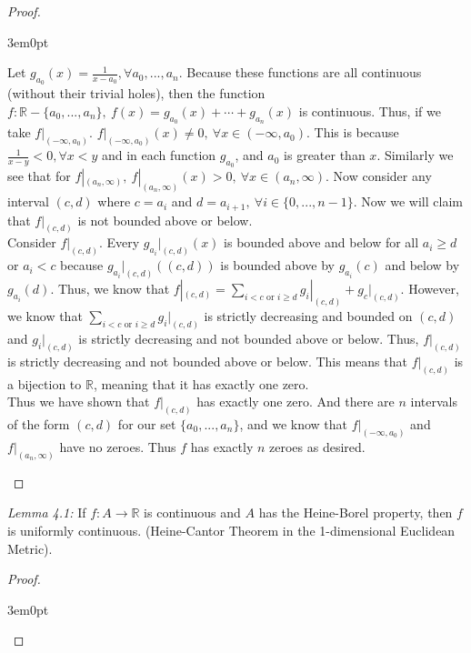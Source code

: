 \documentclass[11pt]{article}
\newcommand{\R}{\mathbb{R}}
\newenvironment{myproof}
{\begin{proof} \begin{adjustwidth}{3em}{0pt}$ $\par\nobreak\ignorespaces}
{\end{adjustwidth} \end{proof}}
\begin{document}
\begin{flushleft}
\begin{myproof}
Let $g_{a_0}(x) = \frac{1}{x - a_0}, \forall a_0,...,a_n$. Because these functions are all continuous (without their trivial holes), then the function $f: \R - \{a_0,...,a_n\}, \ f(x) = g_{a_0}(x) + \cdots + g_{a_n}(x)$ is continuous. Thus, if we take $f|_{(-\infty, a_0)}$. $f|_{(-\infty, a_0)}(x) \neq 0, \ \forall x \in (- \infty, a_0)$. This is because $\frac{1}{x-y} < 0, \forall x < y$ and in each function $g_{a_0}$, and $a_0$ is greater than $x$. Similarly we see that for $f|_{(a_n, \infty)}, \ f|_{(a_n, \infty)}(x) > 0, \ \forall x \in (a_n, \infty)$. Now consider any interval $(c,d)$ where $c = a_i$ and $d = a_{i+1}, \ \forall i \in \{0,...,n-1\}$. Now we will claim that $f|_{(c,d)}$ is not bounded above or below. \\
\bigskip
Consider $f|_{(c,d)}$. Every $g_{a_i}|_{(c,d)}(x)$ is bounded above and below for all $a_i \geq d$ or $a_i < c$ because $g_{a_i}|_{(c,d)}((c,d))$ is bounded above by $g_{a_i}(c)$ and below by $g_{a_i}(d)$. Thus, we know that $f|_{(c,d)} = \sum_{i < c \text{ or } i \geq d}g_i|_{(c,d)} + g_c|_{(c,d)}$. However, we know that $\sum_{i < c \text{ or } i \geq d} g_i|_{(c,d)}$ is strictly decreasing and bounded on $(c,d)$ and $ g_i|_{(c,d)}$ is strictly decreasing and not bounded above or below. Thus, $f|_{(c,d)}$ is strictly decreasing and not bounded above or below. This means that $f|_{(c,d)}$ is a bijection to $\R$, meaning that it has exactly one zero. \\
\bigskip
Thus we have shown that $f|_{(c,d)}$ has exactly one zero. And there are $n$ intervals of the form $(c,d)$ for our set $\{a_0,...,a_n \}$, and we know that $f|_{(-\infty, a_0)}$ and $f|_{(a_n, \infty)}$ have no zeroes. Thus $f$ has exactly $n$ zeroes as desired.

\end{myproof}

\newpage

\textit{Lemma 4.1:} If $f:A \to \R$ is continuous and $A$ has the Heine-Borel property, then $f$ is uniformly continuous. (Heine-Cantor Theorem in the 1-dimensional Euclidean Metric).

\begin{myproof}


\end{myproof}
\end{flushleft}
\end{document}
